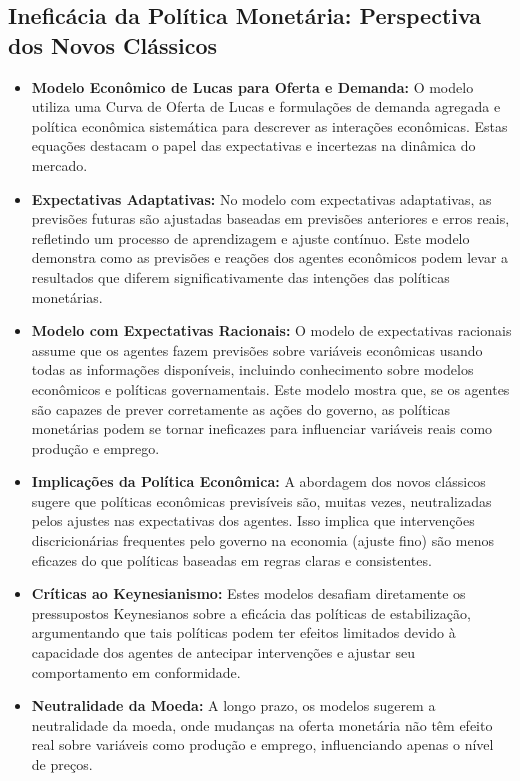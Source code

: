 \documentclass[a4paper,12pt]{article}[abntex2]
\begin{document}
\subsection{Ineficácia da Política Monetária: Perspectiva dos Novos Clássicos}
\begin{itemize}
  \item \textbf{Modelo Econômico de Lucas para Oferta e Demanda:} O modelo utiliza uma Curva de Oferta de Lucas e formulações de demanda agregada e política econômica sistemática para descrever as interações econômicas. Estas equações destacam o papel das expectativas e incertezas na dinâmica do mercado.

  \item \textbf{Expectativas Adaptativas:} No modelo com expectativas adaptativas, as previsões futuras são ajustadas baseadas em previsões anteriores e erros reais, refletindo um processo de aprendizagem e ajuste contínuo. Este modelo demonstra como as previsões e reações dos agentes econômicos podem levar a resultados que diferem significativamente das intenções das políticas monetárias.

  \item \textbf{Modelo com Expectativas Racionais:} O modelo de expectativas racionais assume que os agentes fazem previsões sobre variáveis econômicas usando todas as informações disponíveis, incluindo conhecimento sobre modelos econômicos e políticas governamentais. Este modelo mostra que, se os agentes são capazes de prever corretamente as ações do governo, as políticas monetárias podem se tornar ineficazes para influenciar variáveis reais como produção e emprego.

  \item \textbf{Implicações da Política Econômica:} A abordagem dos novos clássicos sugere que políticas econômicas previsíveis são, muitas vezes, neutralizadas pelos ajustes nas expectativas dos agentes. Isso implica que intervenções discricionárias frequentes pelo governo na economia (ajuste fino) são menos eficazes do que políticas baseadas em regras claras e consistentes.

  \item \textbf{Críticas ao Keynesianismo:} Estes modelos desafiam diretamente os pressupostos Keynesianos sobre a eficácia das políticas de estabilização, argumentando que tais políticas podem ter efeitos limitados devido à capacidade dos agentes de antecipar intervenções e ajustar seu comportamento em conformidade.

  \item \textbf{Neutralidade da Moeda:} A longo prazo, os modelos sugerem a neutralidade da moeda, onde mudanças na oferta monetária não têm efeito real sobre variáveis como produção e emprego, influenciando apenas o nível de preços.
\end{itemize}
\end{document}
